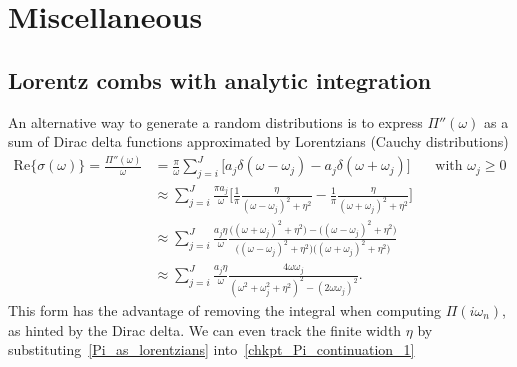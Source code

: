 \documentclass[notitlepage,11pt,nofootinbib]{revtex4-1}
\begin{document}
\section{Miscellaneous}
\subsection{Lorentz combs with analytic integration}
An alternative way to generate a random distributions is to express $\Pi''(\omega)$ as a sum of Dirac delta functions approximated by Lorentzians (Cauchy distributions)
\begin{align}
\text{Re}\{ \sigma(\omega) \} = \frac{\Pi''(\omega)}{\omega}
&=
\frac{\pi}{\omega}
\sum_{j=i}^{J}
\Big[
a_j\delta(\omega-\omega_j)
-a_j\delta(\omega+\omega_j)
\Big]
&&\text{with }\omega_j\geq0
\label{Pi_as_delta}
\\
&\approx
\sum_{j=i}^{J}
\frac{\pi a_j}{\omega}
\Big[
\frac{1}{\pi}
\frac{\eta}{(\omega-\omega_j)^2+\eta^2}
-
\frac{1}{\pi}
\frac{\eta}{(\omega+\omega_j)^2+\eta^2}
\Big]
\label{Pi_as_lorentzians}
\\
&\approx
\sum_{j=i}^{J}
\frac{a_j\eta}{\omega}
\frac{
\big((\omega+\omega_j)^2+\eta^2\big) 
-\big((\omega-\omega_j)^2+\eta^2\big)
}{
\big((\omega-\omega_j)^2+\eta^2\big)
\big((\omega+\omega_j)^2+\eta^2\big)
}
\\
&\approx
\sum_{j=i}^{J}
\frac{a_j\eta}{\omega}
\frac{
4\omega\omega_j
}{
(\omega^2+\omega_j^2+\eta^2)^2 - (2\omega\omega_j)^2
}.
\label{sigma_lorentz}
\end{align}
This form has the advantage of removing the integral when computing $\Pi(i\omega_n)$, as hinted by the Dirac delta.
We can even track the finite width $\eta$ by substituting~\eqref{Pi_as_lorentzians} into~\eqref{chkpt_Pi_continuation_1}
\end{document}
